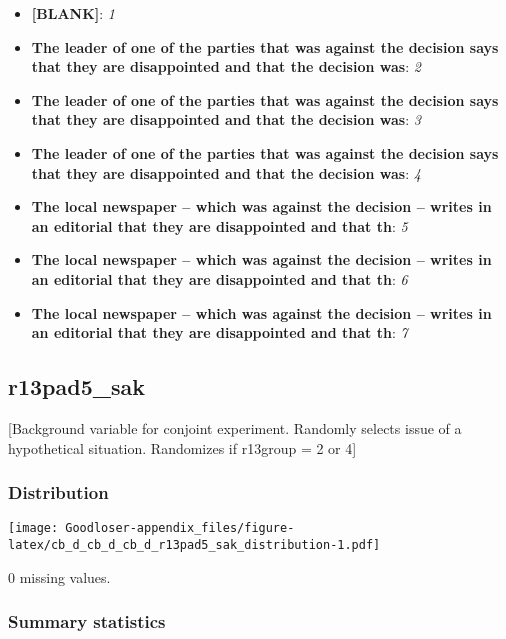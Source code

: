 \documentclass[
]{book}
\providecommand{\tightlist}{%
  \setlength{\itemsep}{0pt}\setlength{\parskip}{0pt}}
\begin{document}
\begin{itemize}
\tightlist
\item
  \textbf{{[}BLANK{]}}: \emph{1}
\item
  \textbf{The leader of one of the parties that was against the decision says that they are disappointed and that the decision was}: \emph{2}
\item
  \textbf{The leader of one of the parties that was against the decision says that they are disappointed and that the decision was}: \emph{3}
\item
  \textbf{The leader of one of the parties that was against the decision says that they are disappointed and that the decision was}: \emph{4}
\item
  \textbf{The local newspaper -- which was against the decision -- writes in an editorial that they are disappointed and that th}: \emph{5}
\item
  \textbf{The local newspaper -- which was against the decision -- writes in an editorial that they are disappointed and that th}: \emph{6}
\item
  \textbf{The local newspaper -- which was against the decision -- writes in an editorial that they are disappointed and that th}: \emph{7}
\end{itemize}

\hypertarget{r13pad5_sak}{%
\subsection{r13pad5\_sak}\label{r13pad5_sak}}

{[}Background variable for conjoint experiment. Randomly selects issue of a hypothetical situation. Randomizes if r13group = 2 or 4{]}

\hypertarget{r13pad5_sak_distribution}{%
\subsubsection{Distribution}\label{r13pad5_sak_distribution}}

\texttt{[image: Goodloser-appendix\_files/figure-latex/cb\_d\_cb\_d\_cb\_d\_r13pad5\_sak\_distribution-1.pdf]}

0 missing values.

\hypertarget{r13pad5_sak_summary}{%
\subsubsection{Summary statistics}\label{r13pad5_sak_summary}}
\end{document}
